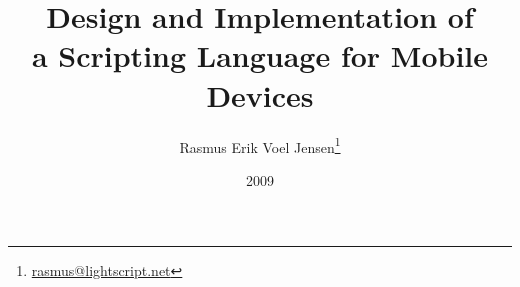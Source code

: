 \documentclass[a4paper,landscape]{slides}
\title{Design and Implementation of \\ a Scripting Language for Mobile Devices }
\author{Rasmus Erik Voel Jensen\footnote{\url{rasmus@lightscript.net}}}
\date{2009}
\begin{document}
\maketitle

\begin{comment}

- Goal:  what, why, how
  - The mobile landscape
  - Goal
  - Plan
- The developed languages
  - Yolan - intro
    - Common design and features
    - Yolan-specific design and features
  - LightScript
    - EcmaScript subset - why, what, and what not
    - LightScript design and features
  - Benchmarks
    - Approximated JAR size
    - Speed
- Conclusion and further work
  - Recent updates, LightScript 1.2
  - Further directions
    - More libraries and applications
    - Linting and pretty printing
    - Version for embedded devices
    - Zooming interfaces
  - Conclusion


- The mobile landscape
  - Phones and smartphones 
  - Symbian, Windows Mobile, iPhone, Android, RIM, other Linux'es, other proprietary operating systems
  - Java Micro Edition
    - CLDC, MIDP, APIs
    - No dynamic code loading
    - No reflection

------------------------------------------

- Introduction
  - Speech structure
    - Introduction: goal, mobile landscape
    - Body
  - The mobile landscape
    - Phones vs. smartphones
    - Java Micro Edition 
    - Scripting languages
  - Goal: A scripting language that runs on low-end mobile phones
    - portable, embeddable, low memory footprint
    - expressiveness - first class functions, easy use of maps and stacks
    - loading of scripts at run time
    - a practical tool

  - Approach
    - bottom up, incremental developement
    - series of prototypes: parsers, compilers, virtual machines, forth dialects, mobile experiments, Yolan, LightScript
    - research, reimplement, reevaluate, repeat
    - direction kept in mind -- EcmaScript-like language for mobile devices
- Body
  - Yolan
    - Runs on CLDC 1.0+
    - Has standard Java classes for built in types, support for hashtables, stacks, ...
    - Scripts can be loaded as source code at run time
    - Functions are first class values
    - Fast variable access. Online execution
    - Integer only. Single false value 
  - Yolan
    - Lazy Java interface
    - Lisp like syntax. Dynamic scoping
    - Evaluation by walking through the syntax tree. Simple optimisations at execution time. Single class.
    - Sets the bar for code footprint $\approx$ 5KB
    - A stepping stone / pilot plant for LightScript
  - LightScript - introduction
  - JavaScript/EcmaScript
  - Implementation
    - Imperative top down operator precedence parser
    - Compiler
    - Stack based virtual machine
  - LightScript 1.0
    - Closures, lexical scoping, subset of EcmaScript, object, prototypical inheritance, exceptions, scripts loadable at run time 
    - Code footprint $\approx$ 11KB

- Conclusion

\end{comment}
\end{document}
